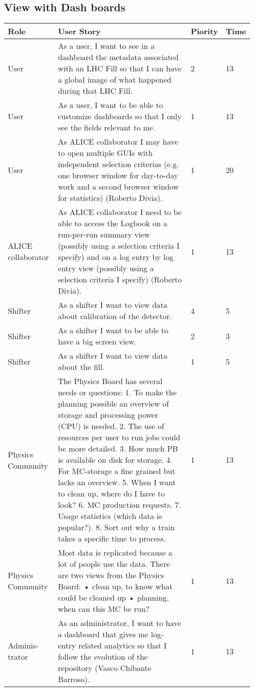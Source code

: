 \subsection{View with Dash boards}
\begin{longtable}{ | p{2cm} | p{8cm} | p{1.5cm} | l |}
\hline
Role & User Story & Piority & Time \\ \hline
User &  As a user, I want to see in a dashboard the metadata associated with
an LHC Fill so that I can have a global image of what happened during that LHC Fill. & 2 & 13 \\ \hline
User &  As a user, I want to be able to customize dashboards so that I only see the fields relevant to me. & 1 & 13 \\ \hline
User &  As ALICE collaborator I may have to open multiple GUIs with independent selection criterias (e.g. one browser window for day-to-day work and a second browser window for statistics) (Roberto Divia). & 1 & 20 \\ \hline
ALICE collaborator &  As ALICE collaborator I need to be able to access the Logbook on a run-per-run summary view (possibly using a selection criteria I specify) and on a log entry by log entry view (possibly using a selection criteria
I specify) (Roberto Divia). & 1 & 13 \\ \hline
Shifter & As a shifter I want to view data about calibration of the detector. & 4 & 5 \\ \hline
Shifter & As a shifter I want to be able to have a big screen view. & 2 & 3 \\ \hline
Shifter & As a shifter I want to view data about the fill. & 1 & 5\\ \hline
Physics Community & The Physics Board has several needs or questions:
1. To make the planning possible an overview of storage and processing
power (CPU) is needed.
2. The use of resources per user to run jobs could be more detailed.
3. How much PB is available on disk for storage.
4. For MC-storage a fine grained but lacks an overview.
5. When I want to clean up, where do I have to look?
6. MC production requests.
7. Usage statistics (which data is popular?).
8. Sort out why a train takes a specific time to process. & 1 & 13\\ \hline
Physics Community & Most data is replicated because a lot of people use the data.
There are two views from the Physics Board:
• clean up, to know what could be cleaned up
• planning, when can this MC be run?
& 1 & 13 \\ \hline
Adminis-trator & As an administrator, I want to have a dashboard that gives me log-
entry related analytics so that I follow the evolution of the repository
(Vasco Chibante Barroso). & 1 & 13 \\ \hline

\end{longtable}

